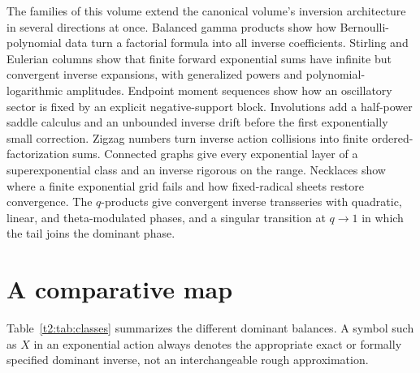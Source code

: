 \documentclass[11pt,openany]{book}
\numberwithin{equation}{chapter}
\theoremstyle{plain}
\theoremstyle{definition}
\theoremstyle{remark}
\begin{document}
The families of this volume extend the canonical volume's inversion
architecture in several directions at once.  Balanced gamma products show
how Bernoulli-polynomial data turn a factorial formula into all inverse
coefficients.  Stirling and Eulerian columns show that finite forward
exponential sums have infinite but convergent inverse expansions, with
generalized powers and polynomial-logarithmic amplitudes.  Endpoint moment
sequences show how an oscillatory sector is fixed by an explicit
negative-support block.  Involutions add a half-power saddle calculus and an
unbounded inverse drift before the first exponentially small correction.
Zigzag numbers turn inverse action collisions into finite
ordered-factorization sums.  Connected graphs give every exponential layer
of a superexponential class and an inverse rigorous on the range.  Necklaces
show where a finite exponential grid fails and how fixed-radical sheets
restore convergence.  The $q$-products give convergent inverse transseries
with quadratic, linear, and theta-modulated phases, and a singular
transition at $q\to1$ in which the tail joins the dominant phase.

\label{t2:sec:synthesis}

\section{A comparative map}

Table~\ref{t2:tab:classes} summarizes the different dominant balances. A symbol such as $X$ in an exponential action always denotes the appropriate exact or formally specified dominant inverse, not an interchangeable rough approximation.
\end{document}
